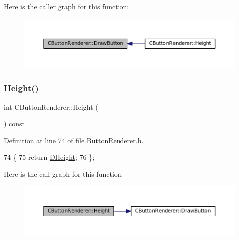 Here is the caller graph for this function\+:
\nopagebreak
\begin{figure}[H]
\begin{center}
\leavevmode
\includegraphics[width=350pt]{classCButtonRenderer_a9f29dd6d2243ddae58211706cc6b37b6_icgraph}
\end{center}
\end{figure}
\hypertarget{classCButtonRenderer_aecdea7c8978a3d0fb27f3a7bf49d8387}{}\label{classCButtonRenderer_aecdea7c8978a3d0fb27f3a7bf49d8387} 
\subsubsection{\texorpdfstring{Height()}{Height()}\hspace{0.1cm}{\footnotesize\ttfamily [1/2]}}
{\footnotesize\ttfamily int C\+Button\+Renderer\+::\+Height (\begin{DoxyParamCaption}{ }\end{DoxyParamCaption}) const\hspace{0.3cm}{\ttfamily [inline]}}



Definition at line 74 of file Button\+Renderer.\+h.


\begin{DoxyCode}
74                           \{
75             \textcolor{keywordflow}{return} \hyperlink{classCButtonRenderer_a7e3d605b90c45d87ac1396c23c90b250}{DHeight};    
76         \};
\end{DoxyCode}
Here is the call graph for this function\+:
\nopagebreak
\begin{figure}[H]
\begin{center}
\leavevmode
\includegraphics[width=350pt]{classCButtonRenderer_aecdea7c8978a3d0fb27f3a7bf49d8387_cgraph}
\end{center}
\end{figure}
\hypertarget{classCButtonRenderer_addba56a5d490f33010c919020e67a376}{}\label{classCButtonRenderer_addba56a5d490f33010c919020e67a376} 
